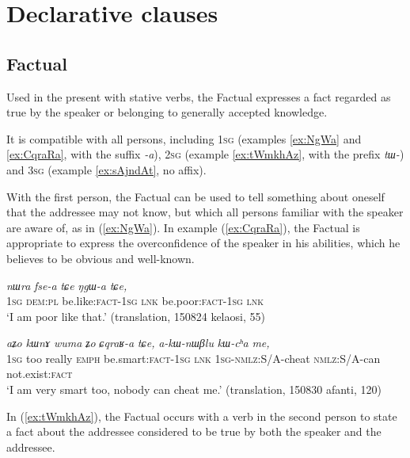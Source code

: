 \documentclass[11pt]{article}
\newcommand{\ipa}[1]{{\phon\textit{#1}}} %
\newcommand{\refb}[1]{(\ref{#1})}
\begin{document}
\section{Declarative clauses} \label{sec:declarative}


\subsection{Factual}

Used in the present with stative verbs, the Factual expresses a fact regarded as true by the speaker or belonging to generally accepted knowledge. 

It is compatible with all persons, including \textsc{1sg} (examples \ref{ex:NgWa} and \ref{ex:CqraRa}, with the suffix \ipa{-a}), \textsc{2sg} (example \ref{ex:tWmkhAz}, with the prefix \ipa{tɯ-}) and \textsc{3sg} (example \ref{ex:sAjndAt}, no affix).

With the first person, the Factual can be used to tell something about oneself that the addressee may not know, but which all persons familiar with the speaker are aware of, as in \refb{ex:NgWa}. In example \refb{ex:CqraRa}, the Factual is appropriate to express the overconfidence of the speaker in his abilities, which he believes to be obvious and well-known.

\begin{exe}
\ex \label{ex:NgWa}
\gll \ipa{aʑo} 	\ipa{nɯra} 	\ipa{fse-a} 	\ipa{tɕe} 	\ipa{ŋgɯ-a} 	\ipa{tɕe,} \\
\textsc{1sg} \textsc{dem:pl} be.like:\textsc{fact-1sg} \textsc{lnk} be.poor:\textsc{fact-1sg} \textsc{lnk} \\
\glt `I am poor like that.' (translation, 150824 kelaosi, 55)
\end{exe}

\begin{exe}
\ex \label{ex:CqraRa}
\gll
\ipa{aʑo} 	\ipa{kɯnɤ} 	\ipa{wuma} 	\ipa{ʑo} 	\ipa{ɕqraʁ-a} 	\ipa{tɕe,} 	\ipa{a-kɯ-nɯβlu} 	\ipa{kɯ-cʰa} \ipa{me,}  \\
\textsc{1sg} too really \textsc{emph} be.smart:\textsc{fact-1sg} \textsc{lnk} \textsc{1sg}-\textsc{nmlz}:S/A-cheat \textsc{nmlz}:S/A-can not.exist:\textsc{fact} \\
\glt `I am very smart too, nobody can cheat me.' (translation, 150830 afanti, 120)
\end{exe}

In \refb{ex:tWmkhAz}, the Factual occurs with a verb in the second person to state a fact about the addressee considered to be true by both the speaker and the addressee.
\end{document}
